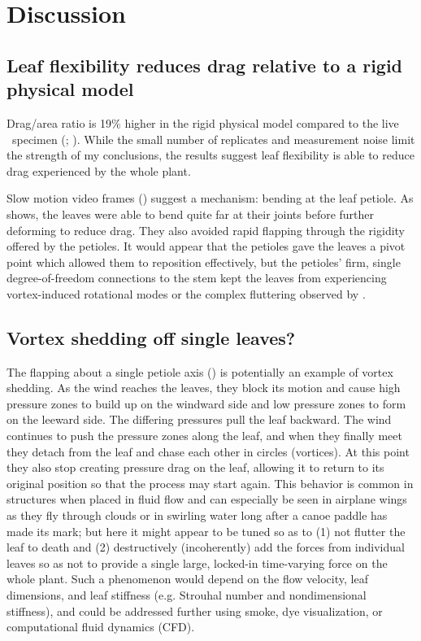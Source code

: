 \section{Discussion}
\label{sec:discussion}

\subsection{Leaf flexibility reduces drag relative to a rigid physical model}
Drag/area ratio is 19\% higher in the rigid physical model compared to the live \Cxparadisi\ specimen (; ). While the small number of replicates and measurement noise limit the strength of my conclusions, the results suggest leaf flexibility is able to reduce drag experienced by the whole plant. 

Slow motion video frames () suggest a mechanism: bending at the leaf petiole. As  shows, the leaves were able to bend quite far at their joints before further deforming to reduce drag. They also avoided rapid flapping through the rigidity offered by the petioles. It would appear that the petioles gave the leaves a pivot point which allowed them to reposition effectively, but the petioles' firm, single degree-of-freedom connections to the stem kept the leaves from experiencing vortex-induced rotational modes or the complex fluttering observed by \citet{miller2012reconfiguration}. 

\subsection{Vortex shedding off single leaves?}
The flapping about a single petiole axis () is potentially an example of vortex shedding. As the wind reaches the leaves, they block its motion and cause high pressure zones to build up on the windward side and low pressure zones to form on the leeward side. The differing pressures pull the leaf backward. The wind continues to push the pressure zones along the leaf, and when they finally meet they detach from the leaf and chase each other in circles (vortices). At this point they also stop creating pressure drag on the leaf, allowing it to return to its original position so that the process may start again. This behavior is common in structures when placed in fluid flow and can especially be seen in airplane wings as they fly through clouds or in swirling water long after a canoe paddle has made its mark; but here it might appear to be tuned so as to (1) not flutter the leaf to death and (2) destructively (incoherently) add the forces from individual leaves so as not to provide a single large, locked-in time-varying force on the whole plant. Such a phenomenon would depend on the flow velocity, leaf dimensions, and leaf stiffness (e.g. Strouhal number and nondimensional stiffness), and could be addressed further using smoke, dye visualization, or computational fluid dynamics (CFD). 

